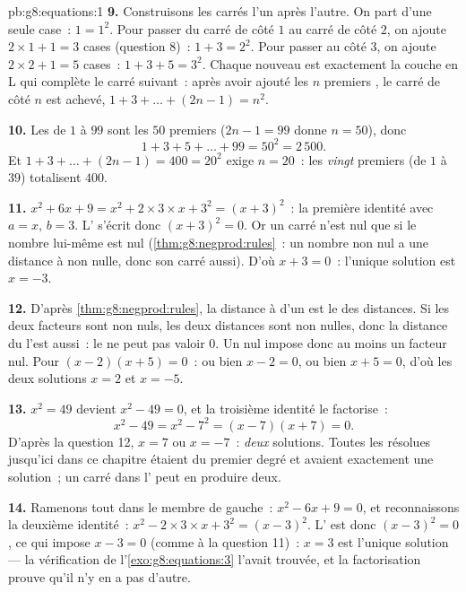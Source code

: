 \begin{solution}{pb:g8:equations:1}
\textbf{9.} Construisons les carrés l'un après l'autre. On part
d'une seule case~: $1 = 1^2$. Pour passer du carré de côté $1$ au
carré de côté $2$, on ajoute $2 \times 1 + 1 = 3$ cases (question
8)~: $1 + 3 = 2^2$. Pour passer au côté $3$, on ajoute
$2 \times 2 + 1 = 5$ cases~: $1 + 3 + 5 = 3^2$. Chaque nouveau
 est exactement la couche en L qui complète le carré
suivant~: après avoir ajouté les $n$ premiers , le
carré de côté $n$ est achevé,
$1 + 3 + \dots + (2n - 1) = n^2$.

\textbf{10.} Les  de $1$ à $99$ sont les $50$
premiers ($2n - 1 = 99$ donne $n = 50$), donc
\[
1 + 3 + 5 + \dots + 99 = 50^2 = 2\,500 .
\]
Et $1 + 3 + \dots + (2n - 1) = 400 = 20^2$ exige $n = 20$~: les
\emph{vingt} premiers  (de $1$ à $39$) totalisent
$400$.

\textbf{11.} $x^2 + 6x + 9 = x^2 + 2 \times 3 \times x + 3^2 =
(x + 3)^2$~: la première identité avec $a = x$, $b = 3$.
L' s'écrit donc $(x + 3)^2 = 0$. Or un carré n'est nul que
si le nombre lui-même est nul (\cref{thm:g8:negprod:rules}~: un
nombre non nul a une distance à  non nulle, donc son carré
aussi). D'où $x + 3 = 0$~: l'unique solution est $x = -3$.

\textbf{12.} D'après \cref{thm:g8:negprod:rules}, la distance à 
d'un  est le  des distances. Si les deux facteurs sont
non nuls, les deux distances sont non nulles, donc la distance du
 l'est aussi~: le  ne peut pas valoir $0$. Un 
nul impose donc au moins un facteur nul. Pour
$(x - 2)(x + 5) = 0$~: ou bien $x - 2 = 0$, ou bien $x + 5 = 0$,
d'où les deux solutions $x = 2$ et $x = -5$.

\textbf{13.} $x^2 = 49$ devient $x^2 - 49 = 0$, et la troisième
identité le factorise~:
\[
x^2 - 49 = x^2 - 7^2 = (x - 7)(x + 7) = 0 .
\]
D'après la question 12, $x = 7$ ou $x = -7$~: \emph{deux}
solutions. Toutes les  résolues jusqu'ici dans ce chapitre
étaient du premier degré et avaient exactement une solution~; un
carré dans l' peut en produire deux.

\textbf{14.} Ramenons tout dans le membre de gauche~:
$x^2 - 6x + 9 = 0$, et reconnaissons la deuxième identité~:
$x^2 - 2 \times 3 \times x + 3^2 = (x - 3)^2$. L' est donc
$(x - 3)^2 = 0$, ce qui impose $x - 3 = 0$ (comme à la question
11)~: $x = 3$ est l'unique solution --- la vérification de
l'\cref{exo:g8:equations:3} l'avait trouvée, et la factorisation
prouve qu'il n'y en a pas d'autre.


\end{solution}
